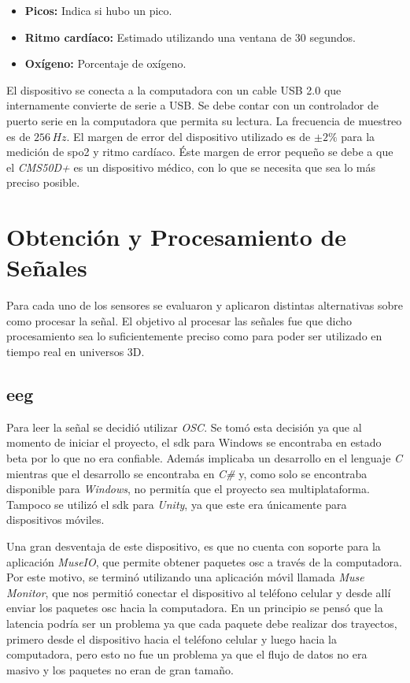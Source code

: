 \begin{itemize}
\item \textbf{Picos:}  Indica si hubo un pico.
\item \textbf{Ritmo cardíaco:} Estimado utilizando una ventana de 30 segundos.
\item \textbf{Oxígeno:} Porcentaje de oxígeno.
\end{itemize} 

El dispositivo se conecta a la computadora con un cable USB 2.0 que internamente convierte de serie a USB. Se debe contar con un controlador de puerto serie en la computadora que permita su lectura. La frecuencia de muestreo es de $256 \, Hz$. El margen de error del dispositivo utilizado es de $\pm2\%$ para la medición de \acrshort{spo2} y ritmo cardíaco. Éste margen de error pequeño se debe a que el \emph{CMS50D+} es un dispositivo médico, con lo que se necesita que sea lo más preciso posible.

\section{Obtención y Procesamiento de Señales}

Para cada uno de los sensores se evaluaron y aplicaron distintas alternativas sobre como procesar la señal. El objetivo al procesar las señales fue que dicho procesamiento sea lo suficientemente preciso como para poder ser utilizado en tiempo real en universos 3D.

\subsection{\acrshort{eeg}} \label{sec:eeg-signal-processing}

Para leer la señal se decidió utilizar \emph{OSC}. Se tomó esta decisión ya que al momento de iniciar el proyecto, el \acrshort{sdk} para Windows se encontraba en estado beta por lo que no era confiable. Además implicaba un desarrollo en el lenguaje \emph{C} mientras que el desarrollo se encontraba en \emph{C\#} y, como solo se encontraba disponible para \emph{Windows}, no permitía que el proyecto sea multiplataforma. Tampoco se utilizó el \acrshort{sdk} para \emph{Unity}, ya que este era únicamente para dispositivos móviles.

Una gran desventaja de este dispositivo, es que no cuenta con soporte para la aplicación \emph{MuseIO}, que permite obtener paquetes \acrshort{osc} a través de la computadora. Por este motivo, se terminó utilizando una aplicación móvil llamada \emph{Muse Monitor}, que nos permitió conectar el dispositivo al teléfono celular y desde allí enviar los paquetes \acrshort{osc} hacia la computadora. En un principio se pensó que la latencia podría ser un problema ya que cada paquete debe realizar dos trayectos, primero desde el dispositivo hacia el teléfono celular y luego hacia la computadora, pero esto no fue un problema ya que el flujo de datos no era masivo y los paquetes no eran de gran tamaño.


